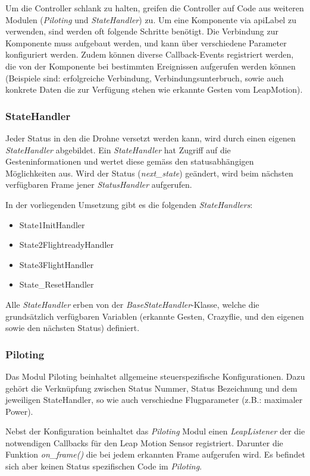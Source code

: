 Um die Controller schlank zu halten, greifen die Controller auf Code aus weiteren Modulen (\textit{Piloting} und \textit{StateHandler}) zu.
Um eine Komponente via \gls{apiLabel} zu verwenden, sind werden oft folgende Schritte benötigt.
Die Verbindung zur Komponente muss aufgebaut werden, und kann über verschiedene Parameter konfiguriert werden.
Zudem können diverse Callback-Events registriert werden, die von der Komponente bei bestimmten Ereignissen aufgerufen werden können (Beispiele sind: erfolgreiche Verbindung, Verbindungsunterbruch, sowie auch konkrete Daten die zur Verfügung stehen wie erkannte Gesten vom LeapMotion).

\subsubsection{StateHandler}
Jeder Status in den die Drohne versetzt werden kann, wird durch einen eigenen \textit{StateHandler} abgebildet.
Ein \textit{StateHandler} hat Zugriff auf die Gesteninformationen und wertet diese gemäss den statusabhängigen Möglichkeiten aus.
Wird der Status (\textit{next\_state}) geändert, wird beim nächsten verfügbaren Frame jener \textit{StatusHandler} aufgerufen.

In der vorliegenden Umsetzung gibt es die folgenden \textit{StateHandlers}:
\begin{itemize}
	\item State1InitHandler
	\item State2FlightreadyHandler
	\item State3FlightHandler
	\item State\_ResetHandler
\end{itemize}
Alle \textit{StateHandler} erben von der \textit{BaseStateHandler}-Klasse, welche die grundsätzlich verfügbaren Variablen (erkannte Gesten, Crazyflie, und den eigenen sowie den nächsten Status) definiert.

\subsubsection{Piloting}
Das Modul Piloting beinhaltet allgemeine steuerspezifische Konfigurationen.
Dazu gehört die Verknüpfung zwischen Status Nummer, Status Bezeichnung und dem jeweiligen StateHandler, so wie auch verschiedne Flugparameter (z.B.: maximaler Power).

Nebst der Konfiguration beinhaltet das \textit{Piloting} Modul einen \textit{LeapListener} der die notwendigen Callbacks für den Leap Motion Sensor registriert. Darunter die Funktion \textit{on\_frame()} die bei jedem erkannten Frame aufgerufen wird.
Es befindet sich aber keinen Status spezifischen Code im \textit{Piloting}.

